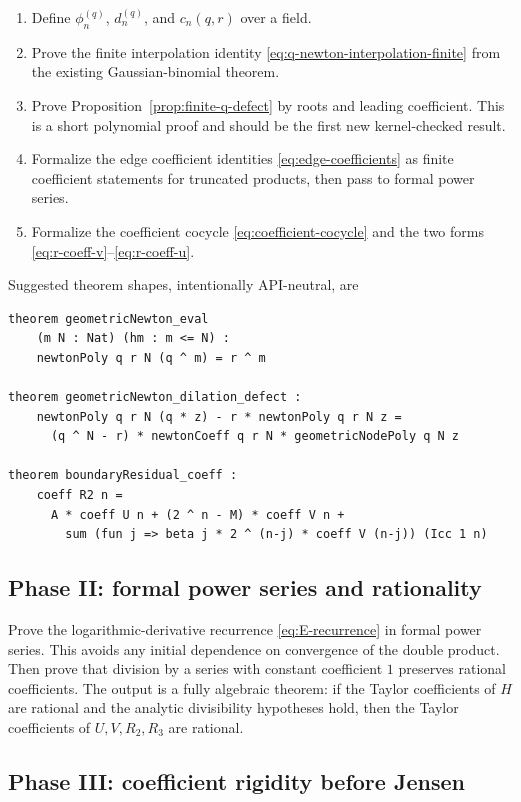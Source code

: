 \documentclass[11pt]{article}
\theoremstyle{definition}
\begin{document}
\begin{enumerate}
\item Define \(\phi_n^{(q)}\), \(d_n^{(q)}\), and \(c_n(q,r)\) over a field.
\item Prove the finite interpolation identity \eqref{eq:q-newton-interpolation-finite} from the existing Gaussian-binomial theorem.
\item Prove Proposition~\ref{prop:finite-q-defect} by roots and leading coefficient.  This is a short polynomial proof and should be the first new kernel-checked result.
\item Formalize the edge coefficient identities \eqref{eq:edge-coefficients} as finite coefficient statements for truncated products, then pass to formal power series.
\item Formalize the coefficient cocycle \eqref{eq:coefficient-cocycle} and the two forms \eqref{eq:r-coeff-v}--\eqref{eq:r-coeff-u}.
\end{enumerate}

Suggested theorem shapes, intentionally API-neutral, are
\begin{lstlisting}[style=pycode,language={}]
theorem geometricNewton_eval
    (m N : Nat) (hm : m <= N) :
    newtonPoly q r N (q ^ m) = r ^ m

theorem geometricNewton_dilation_defect :
    newtonPoly q r N (q * z) - r * newtonPoly q r N z =
      (q ^ N - r) * newtonCoeff q r N * geometricNodePoly q N z

theorem boundaryResidual_coeff :
    coeff R2 n =
      A * coeff U n + (2 ^ n - M) * coeff V n +
        sum (fun j => beta j * 2 ^ (n-j) * coeff V (n-j)) (Icc 1 n)
\end{lstlisting}

\subsection{Phase II: formal power series and rationality}

Prove the logarithmic-derivative recurrence \eqref{eq:E-recurrence} in formal power series.  This avoids any initial dependence on convergence of the double product.  Then prove that division by a series with constant coefficient \(1\) preserves rational coefficients.  The output is a fully algebraic theorem: if the Taylor coefficients of \(H\) are rational and the analytic divisibility hypotheses hold, then the Taylor coefficients of \(U,V,R_2,R_3\) are rational.

\subsection{Phase III: coefficient rigidity before Jensen}
\end{document}
